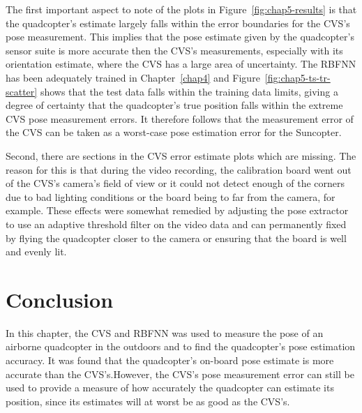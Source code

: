 The first important aspect to note of the plots in Figure~\ref{fig:chap5-results} is that the quadcopter's estimate largely falls within the error boundaries for the CVS's pose measurement. This implies that the pose estimate given by the quadcopter's sensor suite is more accurate then the CVS's measurements, especially with its orientation estimate, where the CVS has a large area of uncertainty. The RBFNN has been adequately trained in Chapter~\ref{chap4} and Figure~\ref{fig:chap5-ts-tr-scatter} shows that the test data falls within the training data limits, giving a degree of certainty that the quadcopter's true position falls within the extreme CVS pose measurement errors. It therefore follows that the measurement error of the CVS can be taken as a worst-case pose estimation error for the Suncopter. 

Second, there are sections in the CVS error estimate plots which are missing. The reason for this is that during the video recording, the calibration board went out of the CVS's camera's field of view or it could not detect enough of the corners due to bad lighting conditions or the board being to far from the camera, for example. These effects were somewhat remedied by adjusting the pose extractor to use an adaptive threshold filter on the video data and can permanently fixed by flying the quadcopter closer to the camera or ensuring that the board is well and evenly lit. 

\section{Conclusion}

In this chapter, the CVS and RBFNN was used to measure the pose of an airborne quadcopter in the outdoors and to find the quadcopter's pose estimation accuracy. It was found that the quadcopter's on-board pose estimate is more accurate than the CVS's.\@ However, the CVS's pose measurement error can still be used to provide a measure of how accurately the quadcopter can estimate its position, since its estimates will at worst be as good as the CVS's.\@ 
